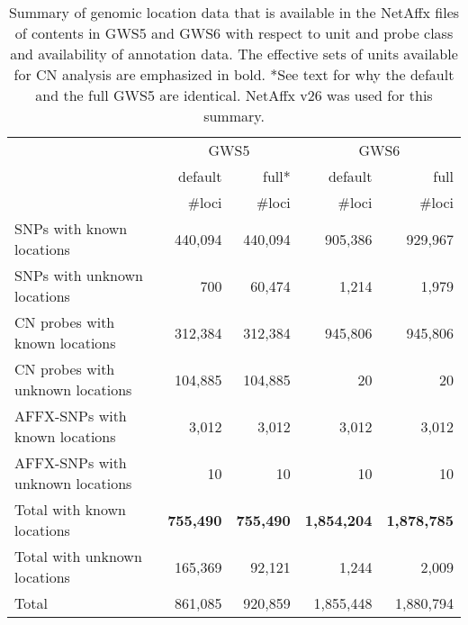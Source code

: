 \documentclass[10pt,a4paper]{article}
\newcommand{\GWSFive}{GWS5\xspace}
\newcommand{\GWSSix}{GWS6\xspace}
\begin{document}
\begin{table}[htp]
\begin{center}
\begin{tabular}{|l||rr||rr|}
\hline
     & \multicolumn{2}{c||}{\GWSFive} & \multicolumn{2}{c|}{\GWSSix} \\
     & default & full* & default & full \\
     & \#loci & \#loci & \#loci & \#loci \\
\hline
\hline
SNPs with known locations        & 440,094 &  440,094  &   905,386 &   929,967 \\
SNPs with unknown locations      &     700 &   60,474  &     1,214 &     1,979 \\
\hline
CN probes with known locations   & 312,384 &  312,384  &   945,806 &   945,806 \\
CN probes with unknown locations & 104,885 &  104,885  &        20 &        20 \\
\hline
AFFX-SNPs with known locations   &   3,012 &    3,012  &     3,012 &     3,012 \\
AFFX-SNPs with unknown locations &      10 &       10  &        10 &        10 \\
\hline
Total with known locations       & \textbf{755,490} & \textbf{755,490} & \textbf{1,854,204}  & \textbf{1,878,785} \\
Total with unknown locations     & 165,369 &   92,121  &    1,244  &     2,009 \\
\hline
Total                            & 861,085 &  920,859  & 1,855,448 & 1,880,794 \\
\hline
\end{tabular}
\end{center}
\caption{Summary of genomic location data that is available in the NetAffx files of contents in GWS5 and GWS6 with respect to unit and probe class and availability of annotation data.  The effective sets of units available for CN analysis are emphasized in bold.  *See text for why the default and the full GWS5 are identical.  NetAffx v26 was used for this summary.}
\label{tblGenomicLocation}
\end{table}
\end{document}
